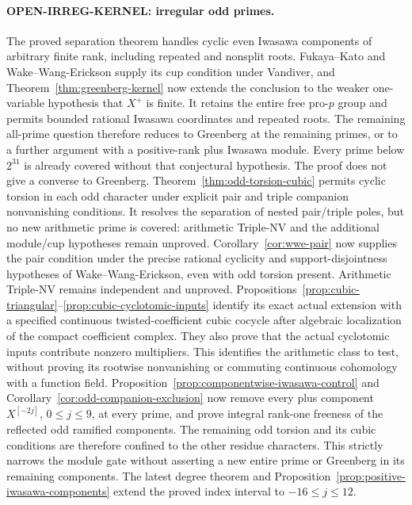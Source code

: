 \documentclass[11pt,a4paper]{article}
\theoremstyle{definition}
\begin{document}
\paragraph{OPEN-IRREG-KERNEL: irregular odd primes.}
The proved separation theorem handles cyclic even Iwasawa components of
arbitrary finite rank, including repeated and nonsplit roots.
Fukaya--Kato and Wake--Wang-Erickson supply its cup condition under
Vandiver, and Theorem~\ref{thm:greenberg-kernel} now extends the
conclusion to the weaker one-variable hypothesis that $X^+$ is finite.
It retains the entire free pro-$p$ group and permits bounded rational
Iwasawa coordinates and repeated roots. The remaining all-prime
question therefore reduces to Greenberg at the remaining primes, or
to a further argument with a positive-rank plus Iwasawa module.
Every prime below $2^{31}$ is already covered without that conjectural
hypothesis. The proof does not give a converse to Greenberg.
Theorem~\ref{thm:odd-torsion-cubic} permits cyclic torsion in each
odd character under explicit pair and triple companion nonvanishing
conditions. It resolves the separation of nested pair/triple poles,
but no new arithmetic prime is covered: arithmetic Triple-NV and
the additional module/cup hypotheses remain unproved.
Corollary~\ref{cor:wwe-pair} now supplies the pair condition under
the precise rational cyclicity and support-disjointness hypotheses
of Wake--Wang-Erickson, even with odd torsion present. Arithmetic
Triple-NV remains independent and unproved.
Propositions~\ref{prop:cubic-triangular}--\ref{prop:cubic-cyclotomic-inputs}
identify its exact actual extension with a specified continuous
twisted-coefficient cubic cocycle after algebraic localization of
the compact coefficient complex. They also prove that the actual
cyclotomic inputs contribute nonzero multipliers. This identifies
the arithmetic class to test, without proving its rootwise
nonvanishing or commuting continuous cohomology with a function field.
Proposition~\ref{prop:componentwise-iwasawa-control} and
Corollary~\ref{cor:odd-companion-exclusion} now remove every plus
component $X^{[-2j]}$, $0\leq j\leq9$, at every prime, and prove
integral rank-one freeness of the reflected odd ramified components.
The remaining odd torsion and its cubic conditions are therefore
confined to the other residue characters. This strictly narrows
the module gate without asserting a new entire prime or Greenberg
in its remaining components. The latest degree theorem and
Proposition~\ref{prop:positive-iwasawa-components} extend the
proved index interval to $-16\leq j\leq12$.
\end{document}
